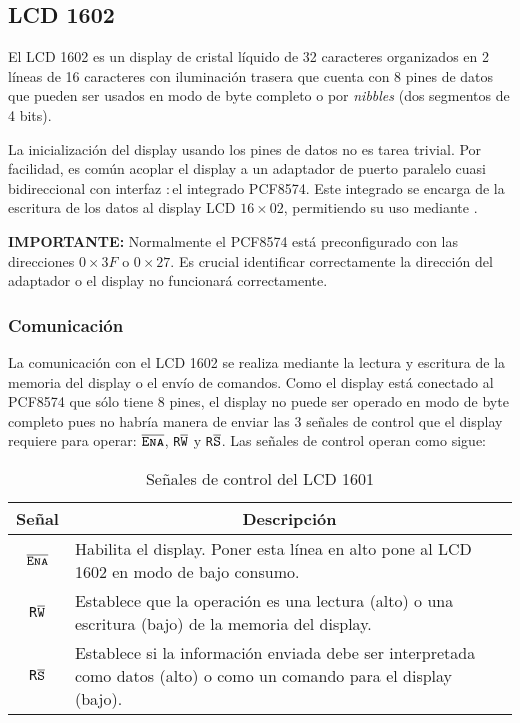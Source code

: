 
\newcommand{\ENA}{$\overline{\mbox{\texttt{\textsc{Ena}}}}$}
\newcommand{\RW}{\texttt{R}$\overline{\mbox{\texttt{W}}}$}
\newcommand{\RS}{\texttt{R}$\overline{\mbox{\texttt{S}}}$}
\newcommand{\hex}[1]{$0\times#1$}

\subsection{LCD 1602 \IIC{}}%
\label{sec:intro-lcd1602}

El LCD 1602 es un display de cristal líquido de 32 caracteres organizados en 2 líneas de 16 caracteres con iluminación trasera que cuenta con 8 pines de datos que pueden ser usados en modo de byte completo o por \emph{nibbles} (dos segmentos de 4 bits).

La inicialización del display usando los pines de datos no es tarea trivial.
Por facilidad, es común acoplar el display a un adaptador de puerto paralelo cuasi bidireccional con interfaz \IIC{}:\,el integrado PCF8574.
Este integrado  se encarga de la escritura de los datos al display LCD $16\times02$, permitiendo su uso mediante \IIC{}.

\medskip

\noindent \textbf{IMPORTANTE:} Normalmente el PCF8574 está preconfigurado con las direcciones \IIC{} \hex{3F} o \hex{27}.
Es crucial identificar correctamente la dirección \IIC{} del adaptador o el display no funcionará correctamente.

\subsubsection{Comunicación}

La comunicación con el LCD 1602 se realiza mediante la lectura y escritura de la memoria del display o el envío de comandos.
Como el display está conectado al PCF8574 que sólo tiene 8 pines, el display no puede ser operado en modo de byte completo pues no habría manera de enviar las 3 señales de control que el display requiere para operar:
\ENA{}, \RW{} y \RS{}.
Las señales de control operan como sigue:

\begin{table}[H]
	\centering
	\caption{Señales de control del LCD 1601}%
	\label{tbl:lcd-control-signals}
	\begin{tabularx}{0.9\linewidth}{c X}
		\toprule
		\multicolumn{1}{c}{\bfseries Señal} &
		\multicolumn{1}{c}{\bfseries Descripción} \\
		\midrule
		\ENA{} & Habilita el display. Poner esta línea en alto pone al LCD 1602 en modo de bajo consumo. \\

		\RW{}  & Establece que la operación es una lectura (alto) o una escritura (bajo) de la memoria del display. \\

		\RS{}  & Establece si la información enviada debe ser interpretada como datos (alto) o como un comando para el display (bajo). \\
		\bottomrule
	\end{tabularx}
\end{table}

